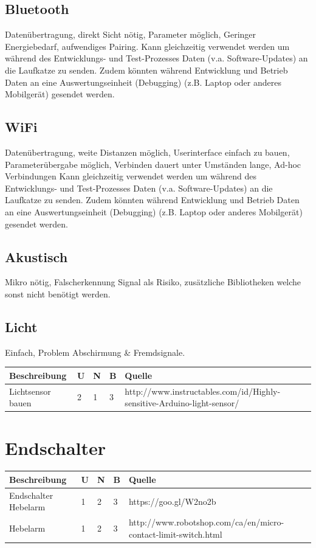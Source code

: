 \documentclass[a4paper]{report}
\begin{document}
\subsection{Bluetooth}
Datenübertragung, direkt Sicht nötig, Parameter möglich, Geringer Energiebedarf, aufwendiges Pairing.
Kann gleichzeitig verwendet werden um während des Entwicklungs- und Test-Prozesses Daten (v.a. Software-Updates) an die Laufkatze zu senden. Zudem könnten während Entwicklung und Betrieb Daten an eine Auswertungseinheit (Debugging) (z.B. Laptop oder anderes Mobilgerät) gesendet werden.

\subsection{WiFi}
Datenübertragung, weite Distanzen möglich, Userinterface einfach zu bauen, Parameterübergabe möglich, Verbinden dauert unter Umständen lange, Ad-hoc Verbindungen
Kann gleichzeitig verwendet werden um während des Entwicklungs- und Test-Prozesses Daten (v.a. Software-Updates) an die Laufkatze zu senden. Zudem könnten während Entwicklung und Betrieb Daten an eine Auswertungseinheit (Debugging) (z.B. Laptop oder anderes Mobilgerät) gesendet werden.

\subsection{Akustisch}
Mikro nötig, Falscherkennung Signal als Risiko, zusätzliche Bibliotheken welche sonst nicht benötigt werden.

\subsection{Licht}
Einfach, Problem Abschirmung \& Fremdsignale.

\vspace{1em}
\noindent
\begin{tabular}{|p{}|p{}|p{}|p{}|p{}|}
	\hline
	\textbf{Beschreibung} & \textbf{U} & \textbf{N} & \textbf{B} & \textbf{Quelle} \\
	\hline
	Lichtsensor bauen & 2 & 1 & 3 & http://www.instructables.com/id/Highly-sensitive-Arduino-light-sensor/ \\
	\hline
\end{tabular}


\section{Endschalter}
\begin{tabular}{|p{}|p{}|p{}|p{}|p{}|}
	\hline
	\textbf{Beschreibung} & \textbf{U} & \textbf{N} & \textbf{B} & \textbf{Quelle} \\
	\hline
	Endschalter Hebelarm & 1 & 2 & 3 & https://goo.gl/W2no2b\\
	\hline
	Hebelarm & 1 & 2 & 3 & http://www.robotshop.com/ca/en/micro-contact-limit-switch.html\\
	\hline
\end{tabular}
\end{document}
